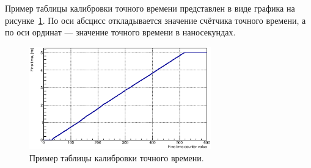 Пример таблицы калибровки точного времени представлен в виде графика на рисунке~\ref{fig:CalibTable}. По оси абсцисс откладывается значение счётчика точного времени, а по оси ординат --- значение точного времени в наносекундах.


\begin{figure}[H]
\centering
\includegraphics[width=0.7\textwidth]{pictures/CalTable_0010_01.eps}
\caption{Пример таблицы калибровки точного времени.}
\label{fig:CalibTable}
\end{figure}
